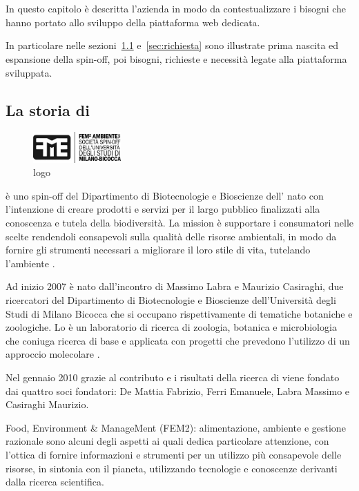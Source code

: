 \chapter{\fem}
\label{chp:fem}
In questo capitolo è descritta l'azienda \textbf{\femsrl} in modo da contestualizzare i bisogni che hanno portato allo sviluppo della piattaforma web dedicata.

In particolare nelle sezioni~\ref{sec:storia-fem} e~\ref{sec:richiesta} sono illustrate prima nascita ed espansione della spin-off, poi bisogni, richieste e necessità legate alla piattaforma sviluppata.

\section{La storia di \fem}
\label{sec:storia-fem}

\begin{figure}
  \centering
  \includegraphics[width=0.3\textwidth]{images/logo-fem}
  \caption{logo}
  \label{fig:logo-fem}
\end{figure}

\textbf{\femsrl} è uno spin-off del Dipartimento di Biotecnologie e Bioscienze dell'{\unimib} nato con l'intenzione di creare prodotti e servizi per il largo pubblico finalizzati alla conoscenza e tutela della biodiversità. La mission è supportare i consumatori nelle scelte rendendoli consapevoli sulla qualità delle risorse ambientali, in modo da fornire gli strumenti necessari a migliorare il loro stile di vita, tutelando l'ambiente \cite{fem2ambiente}.

Ad inizio 2007 è nato \textbf{\zpl} dall'incontro di Massimo Labra e Maurizio Casiraghi, due ricercatori del Dipartimento di Biotecnologie e Bioscienze dell'Università degli Studi di Milano Bicocca che si occupano rispettivamente di tematiche botaniche e zoologiche. Lo {\zpl} è un laboratorio di ricerca di zoologia, botanica e microbiologia che coniuga ricerca di base e applicata con progetti che prevedono l'utilizzo di un approccio molecolare \cite{zooplantlab}.

Nel gennaio 2010 grazie al contributo e i risultati della ricerca di {\zpl} viene fondato {\femsrl} dai quattro soci fondatori: De Mattia Fabrizio, Ferri Emanuele, Labra Massimo e Casiraghi Maurizio.

Food, Environment \& ManageMent (FEM2): alimentazione, ambiente e gestione razionale sono alcuni degli aspetti ai quali {\fem} dedica particolare attenzione, con l'ottica di fornire informazioni e strumenti per un utilizzo più consapevole delle risorse, in sintonia con il pianeta, utilizzando tecnologie e conoscenze derivanti dalla ricerca scientifica.

